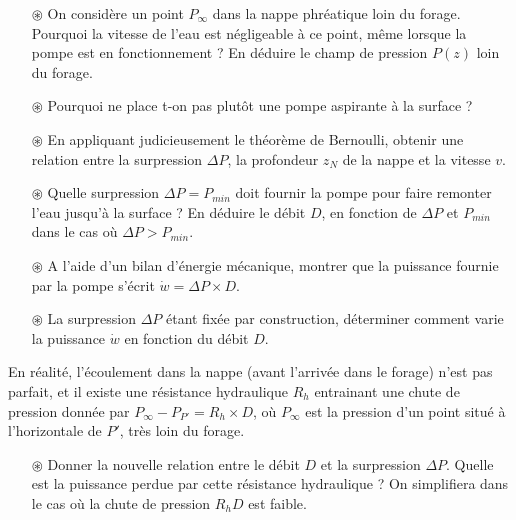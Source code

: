 \documentclass{report}
\begin{document}
\begin{itemize}

	\item[$\circledast$] On considère un point $P_\infty$ dans la nappe phréatique loin du forage. Pourquoi la vitesse de l'eau est négligeable à ce point, même lorsque la pompe est en fonctionnement ? En déduire le champ de pression $P(z)$ loin du forage.

	\item[$\circledast$] Pourquoi ne place t-on pas plutôt une pompe aspirante à la surface ?
	
	\item[$\circledast$] En appliquant judicieusement le théorème de Bernoulli, obtenir une relation entre la surpression $\Delta P$, la profondeur $z_N$ de la nappe et la vitesse $v$. 
	
	\item[$\circledast$] Quelle surpression $\Delta P =P_{min}$ doit fournir la pompe pour faire remonter l'eau jusqu'à la surface ? En déduire le débit $D$, en fonction de $\Delta P$ et $P_{min}$ dans le cas où $\Delta P >P_{min}$.
	
	\item[$\circledast$] A l'aide d'un bilan d'énergie mécanique, montrer que la puissance fournie par la pompe s'écrit $\dot{w}=\Delta P\times D$. 
	
	\item[$\circledast$] La surpression $\Delta P$ étant fixée par construction, déterminer comment varie la puissance $\dot{w}$ en fonction du débit $D$.
	
\end{itemize}
	
En réalité, l'écoulement dans la nappe (avant l'arrivée dans le forage) n'est pas parfait, et il existe une résistance hydraulique $R_h$ entrainant une chute de pression donnée par $P_\infty-P_{P'}=R_h\times D$, où $P_\infty$ est la pression d'un point situé à l'horizontale de $P'$, très loin du forage. 

\begin{itemize}
	
	\item[$\circledast$] Donner la nouvelle relation entre le débit $D$ et la surpression $\Delta P$. Quelle est la puissance perdue par cette résistance hydraulique ? On simplifiera dans le cas où la chute de pression $R_hD$ est faible. 

\end{itemize}

\newpage
\end{document}

